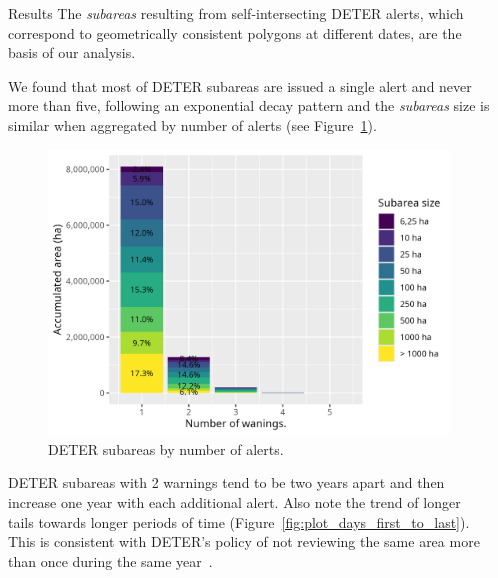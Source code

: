 \documentclass[20pt]{beamer}
\begin{document}
\begin{frame}[fragile,t]
\begin{columns}[t]
\begin{column}{0.33\linewidth}
\end{column}




\begin{column}{0.33\linewidth}

\vspace{0.5cm}

    \begin{block}{Results\vphantom{g}}
        The \textit{subareas} resulting from self-intersecting DETER alerts, which correspond to geometrically consistent polygons at different dates, are the basis of our analysis.

        We found that most of DETER subareas are issued a single alert and never more than five, following an exponential decay pattern and the \textit{subareas} size is similar when aggregated by number of alerts (see Figure~\ref{fig:plot_area_by_warnings}).

\begin{figure}[h] 
    \begin{center}
    \includegraphics[width=\linewidth]{./figures/plot_area_by_warnings.png}
    \caption{DETER subareas by number of alerts. }
    \label{fig:plot_area_by_warnings}
    \end{center}
\end{figure}

        DETER subareas with 2 warnings tend to be two years apart and then increase one year with each additional alert.
        Also note the trend of longer tails towards longer periods of time (Figure~\ref{fig:plot_days_first_to_last}). 
        This is consistent with DETER's policy of not reviewing the same area more than once during the same year~\cite{dealmeida2022}.


\end{block}
\end{column}
\end{columns}
\end{frame}
\end{document}
